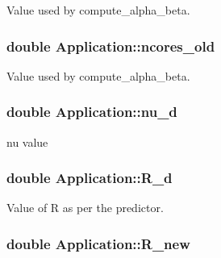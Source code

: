 Value used by compute\-\_\-alpha\-\_\-beta. 

\hypertarget{classApplication_a704e411528bc630525070e8b3e990145}{
\subsubsection[{ncores\-\_\-old}]{\setlength{\rightskip}{0pt plus 5cm}double Application\-::ncores\-\_\-old\hspace{0.3cm}{\ttfamily [private]}}}\label{classApplication_a704e411528bc630525070e8b3e990145}


Value used by compute\-\_\-alpha\-\_\-beta. 

\hypertarget{classApplication_a42c22b9a3130cf1f2722ce222f2e5bae}{
\subsubsection[{nu\-\_\-d}]{\setlength{\rightskip}{0pt plus 5cm}double Application\-::nu\-\_\-d\hspace{0.3cm}{\ttfamily [private]}}}\label{classApplication_a42c22b9a3130cf1f2722ce222f2e5bae}


nu value 

\hypertarget{classApplication_a374d43f68ae27aaed98278e8152a434c}{
\subsubsection[{R\-\_\-d}]{\setlength{\rightskip}{0pt plus 5cm}double Application\-::\-R\-\_\-d\hspace{0.3cm}{\ttfamily [private]}}}\label{classApplication_a374d43f68ae27aaed98278e8152a434c}


Value of R as per the predictor. 

\hypertarget{classApplication_a9e94824741ac0c52d0fa5ede30c72fa1}{
\subsubsection[{R\-\_\-new}]{\setlength{\rightskip}{0pt plus 5cm}double Application\-::\-R\-\_\-new\hspace{0.3cm}{\ttfamily [private]}}}\label{classApplication_a9e94824741ac0c52d0fa5ede30c72fa1}



